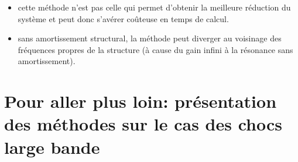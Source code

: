 \begin{itemize}
   \item cette méthode n'est pas celle qui permet d'obtenir la meilleure réduction du système et peut donc s'avérer coûteuse en temps de calcul. 
   \item sans amortissement structural, la méthode peut diverger au voisinage des fréquences propres de la structure (à cause du gain infini à 
	la résonance sans amortissement).
\end{itemize}
































\medskip
\section{Pour aller plus loin: présentation des méthodes sur le cas des chocs large bande}


